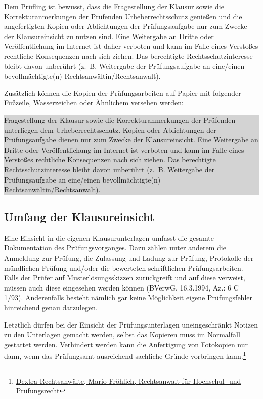 \documentclass[12pt, a4paper]{article}
\begin{document}
Dem Prüfling ist bewusst, dass die Fragestellung der Klausur sowie die Korrekturanmerkungen der Prüfenden Urheberrechtsschutz genießen und die angefertigten Kopien oder Ablichtungen der Prüfungsaufgabe nur zum Zwecke der Klausureinsicht zu nutzen sind. Eine Weitergabe an Dritte oder Veröffentlichung im Internet ist daher verboten und kann im Falle eines Verstoßes rechtliche Konsequenzen nach sich ziehen. Das berechtigte Rechtsschutzinteresse bleibt davon unberührt (z. B. Weitergabe der Prüfungsaufgabe an eine/einen bevollmächtigte(n) Rechtsanwältin/Rechtsanwalt). 

Zusätzlich können die Kopien der Prüfungsarbeiten auf Papier mit folgender Fußzeile, Wasserzeichen oder Ähnlichem versehen werden: 
\noindent\subitem\colorbox{lightgray}{
    \begin{minipage}[h]{0.9\linewidth}
        \footnotesize Fragestellung der Klausur sowie die Korrekturanmerkungen der Prüfenden unterliegen dem Urheberrechtsschutz. Kopien oder Ablichtungen der Prüfungsaufgabe dienen nur zum Zwecke der Klausureinsicht. Eine Weitergabe an Dritte oder Veröffentlichung im Internet ist verboten und kann im Falle eines Verstoßes rechtliche Konsequenzen nach sich ziehen. Das berechtigte Rechtsschutzinteresse bleibt davon unberührt (z. B. Weitergabe der Prüfungsaufgabe an eine/einen bevollmächtigte(n) Rechtsanwältin/Rechtsanwalt).
    \end{minipage}
}

\subsection{Umfang der Klausureinsicht}
Eine Einsicht in die eigenen Klausurunterlagen umfasst die gesamte Dokumentation des Prüfungsvorganges. Dazu zählen unter anderem die Anmeldung zur Prüfung, die Zulassung und Ladung zur Prüfung, Protokolle der mündlichen Prüfung und/oder die bewerteten schriftlichen Prüfungsarbeiten. Falls der Prüfer auf Musterlösungsskizzen zurückgreift und auf diese verweist, müssen auch diese eingesehen werden können (BVerwG, 16.3.1994, Az.: 6 C 1/93). Anderenfalls besteht nämlich gar keine Möglichkeit eigene Prüfungsfehler hinreichend genau darzulegen.

Letztlich dürfen bei der Einsicht der Prüfungsunterlagen uneingeschränkt Notizen zu den Unterlagen gemacht werden, selbst das Kopieren muss im Normalfall gestattet werden. Verhindert werden kann die Anfertigung von Fotokopien nur dann, wenn das Prüfungsamt ausreichend sachliche Gründe vorbringen kann.\footnote{\href{https://www.uniturm.de/magazin/recht/darf-ich-meine-klausur-einsehen-841}{Dextra Rechtsanwälte, Mario Fröhlich, Rechtsanwalt für Hochschul- und Prüfungsrecht}}
\end{document}
